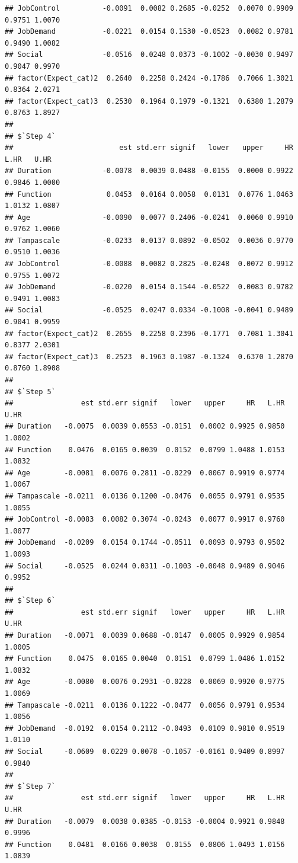 \documentclass[
]{book}
\begin{document}
\begin{verbatim}
## JobControl          -0.0091  0.0082 0.2685 -0.0252  0.0070 0.9909 0.9751 1.0070
## JobDemand           -0.0221  0.0154 0.1530 -0.0523  0.0082 0.9781 0.9490 1.0082
## Social              -0.0516  0.0248 0.0373 -0.1002 -0.0030 0.9497 0.9047 0.9970
## factor(Expect_cat)2  0.2640  0.2258 0.2424 -0.1786  0.7066 1.3021 0.8364 2.0271
## factor(Expect_cat)3  0.2530  0.1964 0.1979 -0.1321  0.6380 1.2879 0.8763 1.8927
## 
## $`Step 4`
##                         est std.err signif   lower   upper     HR   L.HR   U.HR
## Duration            -0.0078  0.0039 0.0488 -0.0155  0.0000 0.9922 0.9846 1.0000
## Function             0.0453  0.0164 0.0058  0.0131  0.0776 1.0463 1.0132 1.0807
## Age                 -0.0090  0.0077 0.2406 -0.0241  0.0060 0.9910 0.9762 1.0060
## Tampascale          -0.0233  0.0137 0.0892 -0.0502  0.0036 0.9770 0.9510 1.0036
## JobControl          -0.0088  0.0082 0.2825 -0.0248  0.0072 0.9912 0.9755 1.0072
## JobDemand           -0.0220  0.0154 0.1544 -0.0522  0.0083 0.9782 0.9491 1.0083
## Social              -0.0525  0.0247 0.0334 -0.1008 -0.0041 0.9489 0.9041 0.9959
## factor(Expect_cat)2  0.2655  0.2258 0.2396 -0.1771  0.7081 1.3041 0.8377 2.0301
## factor(Expect_cat)3  0.2523  0.1963 0.1987 -0.1324  0.6370 1.2870 0.8760 1.8908
## 
## $`Step 5`
##                est std.err signif   lower   upper     HR   L.HR   U.HR
## Duration   -0.0075  0.0039 0.0553 -0.0151  0.0002 0.9925 0.9850 1.0002
## Function    0.0476  0.0165 0.0039  0.0152  0.0799 1.0488 1.0153 1.0832
## Age        -0.0081  0.0076 0.2811 -0.0229  0.0067 0.9919 0.9774 1.0067
## Tampascale -0.0211  0.0136 0.1200 -0.0476  0.0055 0.9791 0.9535 1.0055
## JobControl -0.0083  0.0082 0.3074 -0.0243  0.0077 0.9917 0.9760 1.0077
## JobDemand  -0.0209  0.0154 0.1744 -0.0511  0.0093 0.9793 0.9502 1.0093
## Social     -0.0525  0.0244 0.0311 -0.1003 -0.0048 0.9489 0.9046 0.9952
## 
## $`Step 6`
##                est std.err signif   lower   upper     HR   L.HR   U.HR
## Duration   -0.0071  0.0039 0.0688 -0.0147  0.0005 0.9929 0.9854 1.0005
## Function    0.0475  0.0165 0.0040  0.0151  0.0799 1.0486 1.0152 1.0832
## Age        -0.0080  0.0076 0.2931 -0.0228  0.0069 0.9920 0.9775 1.0069
## Tampascale -0.0211  0.0136 0.1222 -0.0477  0.0056 0.9791 0.9534 1.0056
## JobDemand  -0.0192  0.0154 0.2112 -0.0493  0.0109 0.9810 0.9519 1.0110
## Social     -0.0609  0.0229 0.0078 -0.1057 -0.0161 0.9409 0.8997 0.9840
## 
## $`Step 7`
##                est std.err signif   lower   upper     HR   L.HR   U.HR
## Duration   -0.0079  0.0038 0.0385 -0.0153 -0.0004 0.9921 0.9848 0.9996
## Function    0.0481  0.0166 0.0038  0.0155  0.0806 1.0493 1.0156 1.0839

\end{verbatim}
\end{document}
